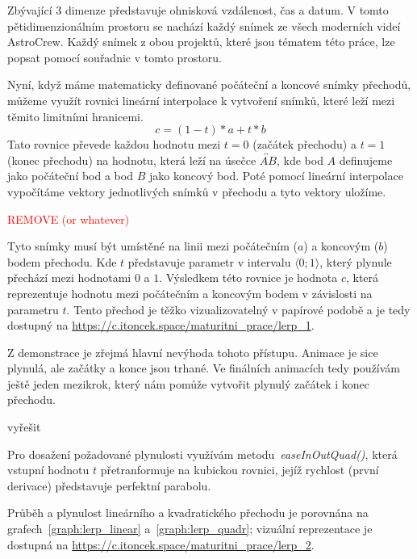 \documentclass[12pt,a4paper,titlepage]{article}
\begin{document}
Zbývající 3 dimenze představuje ohnisková vzdálenost, čas a datum. V tomto pětidimenzionálním prostoru se nachází každý snímek ze všech moderních videí AstroCrew. Každý snímek z obou projektů, které jsou tématem této práce, lze popsat pomocí souřadnic v tomto prostoru.

Nyní, když máme matematicky definované počáteční a koncové snímky přechodů, můžeme využít rovnici lineární interpolace k vytvoření snímků, které leží mezi těmito limitními hranicemi.
\[c = (1-t)*a + t * b\] 
Tato rovnice převede každou hodnotu mezi $t=0$ (začátek přechodu) a $t=1$ (konec přechodu) na hodnotu, která leží na úsečce $\overleftrightarrow{AB}$, kde bod $A$ definujeme jako počáteční bod a bod $B$ jako koncový bod. Poté pomocí lineární interpolace vypočítáme vektory jednotlivých snímků v přechodu a tyto vektory uložíme.

\textcolor{red}{REMOVE (or whatever)}

Tyto snímky musí být umístěné na linii mezi počátečním ($a$) a koncovým ($b$) bodem přechodu. 
Kde $t$ představuje parametr v intervalu $\langle0;1\rangle$, který plynule přechází mezi hodnotami $0$ a $1$. Výsledkem této rovnice je hodnota $c$, která reprezentuje hodnotu mezi počátečním a koncovým bodem v závislosti na parametru $t$. Tento přechod je těžko vizualizovatelný v papírové podobě a je tedy dostupný na \url{https://c.itoncek.space/maturitni_prace/lerp_1}.

Z demonstrace je zřejmá hlavní nevýhoda tohoto přístupu. Animace je sice plynulá, ale začátky a konce jsou trhané. Ve finálních animacích tedy používám ještě jeden mezikrok, který nám pomůže vytvořit plynulý začátek i konec přechodu.

vyřešit

Pro dosažení požadované plynulosti využívám metodu~\textit{easeInOutQuad()}, která vstupní hodnotu $t$ přetranformuje na kubickou rovnici, jejíž rychlost (první derivace) představuje perfektní parabolu. %

Průběh a plynulost lineárního a kvadratického přechodu je porovnána na grafech~\ref{graph:lerp_linear} a~\ref{graph:lerp_quadr}; vizuální reprezentace je dostupná na \url{https://c.itoncek.space/maturitni_prace/lerp_2}.
\end{document}
